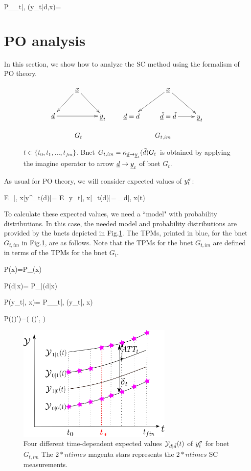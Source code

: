 \beq\color{blue}
P_{\rvy_t|\rvd, \rvx}(y_t|d,x)=
\eeq

\section{PO analysis}
In this section,
we show how
to analyze the
SC method
using the formalism of PO theory.



\begin{figure}[h!]
$$
\begin{array}{ccccc}
\xymatrix{
&\rvx\ar[dl]\ar[dr]
\\
\rvd\ar[rr]&&\rvy_t
}
&&
\xymatrix{
&\rvx\ar[dl]\ar[dr]
\\
\rvd=d&\rvtd=\td\ar[r]&\rvy_t
}
\\
\\
G_t&&G_{t, im}
\end{array}
$$
\caption{$t\in \{t_0, t_1, \ldots, 
t_{fin}\}$.
Bnet 
$G_{t, im}= \kappa_{{\underline{d}}\rightarrow{\underline{y}}_t}
({\tilde{d}})G_t$
is obtained by applying 
the imagine operator to arrow 
${\underline{d}}\rightarrow{\underline{y}}_t$
of bnet $G_t$.}
\label{fig-syn-con-G-im}
\end{figure}

As usual for PO theory,
we will consider
expected values of $y^\sigma_t$:


\beq
E_{\s|\td, x}[y^\s_t(d)]=
 E_{y_t|\td, x}[\rvy_t(d)]=
\caly_{d|\td, x}(t)
\eeq

To calculate these
expected values, we need a ``model"
with probability 
distributions.
In this case,
the needed model and probability
distributions are
provided by the
bnets depicted in Fig.\ref{fig-syn-con-G-im}.
The TPMs,
printed in blue,
for the 
 bnet
$G_{t, im}$
in Fig.\ref{fig-syn-con-G-im},
are as follows.
Note
that the
TPMs for the bnet $G_{t, im}$
are defined in 
terms
of the TPMs for the bnet $G_t$.



\beq\color{blue}
P(x)=P_{\rvx}(x)
\eeq

\beq\color{blue}
P(d|x)= 
P_{\rvd|\rvx}(d|x)
\eeq
 
\beq\color{blue}
P(y_t|\td, x)=
P_{\rvy_t|\rvd, \rvx}
(y_t|\td, x)
\eeq

\beq\color{blue}
P((\td)')=\delta(
(\td)', \td)
\eeq

\begin{figure}[h!]
\centering
\includegraphics[width=3in]
{syn-con/syn-con-bc.png}
\caption{Four different time-dependent
expected 
values ${\cal Y}_{d|{\tilde{d}}}(t)$ of $y^\sigma_t$
for bnet $G_{t, im}$
The $2*ntimes$ magenta  stars
represents the $2*ntimes$ SC measurements.} 
\label{fig-syn-con-bc}
\end{figure}

